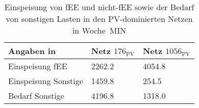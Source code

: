 {
\renewcommand{\arraystretch}{1.2}%
\begin{table}[H]
	\begin{center}
		\caption{Einspeisung von fEE und nicht-fEE sowie der Bedarf von sonstigen Lasten in den PV-dominierten Netzen in Woche~MIN}
		\begin{tabu} to 0.6\textwidth {X[1.7] X[1, r] X[1, r]}
			\toprule
			Angaben in \si{\mwh}	& Netz \(176_{\text{PV}}\) & Netz \(1056_{\text{PV}}\) \\ \midrule
			Einspeisung fEE			& \num{2262.2}   & \num{4054.8}    \\
			Einspeisung Sonstige 	& \num{1459.8}   & \num{254.5}     \\
			Bedarf Sonstige     	& \num{4196.8}   & \num{1318.0}    \\ \bottomrule
		\end{tabu}
		\label{tab:pv_dominated_week_a_char}
	\end{center}
	\vspace{-3mm}%
\end{table}
}